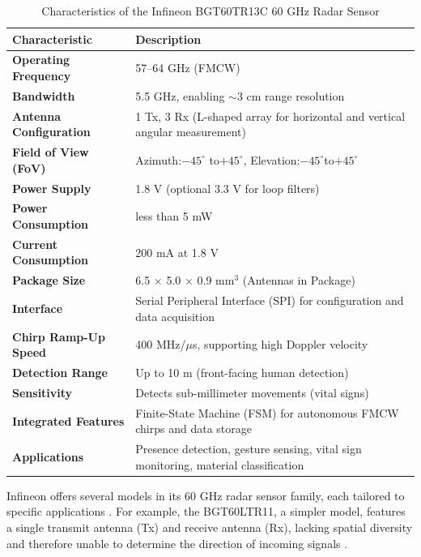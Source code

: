 \begin{table}[h]
\centering
\caption{Characteristics of the Infineon BGT60TR13C 60 GHz Radar Sensor}
\label{tab:bgt60tr13c_specs}
\begin{tabular}{p{4.5cm} p{8cm}}
\toprule
\textbf{Characteristic} & \textbf{Description} \\
\midrule
\textbf{Operating Frequency} & 57--64 GHz (FMCW) \\
\textbf{Bandwidth} & 5.5 GHz, enabling $\sim$3 cm range resolution \\
\textbf{Antenna Configuration} & 1 Tx, 3 Rx (L-shaped array for horizontal and vertical angular measurement) \\
\textbf{Field of View (FoV)} & Azimuth:$-45^\circ$ to$+45^\circ$, Elevation:$-45^\circ$to$+45^\circ$ \\
\textbf{Power Supply} & 1.8 V (optional 3.3 V for loop filters) \\
\textbf{Power Consumption} & less than 5 mW \\
\textbf{Current Consumption} & 200 mA at 1.8 V  \\
\textbf{Package Size} & 6.5 $\times$ 5.0 $\times$ 0.9 mm$^3$ (Antennas in Package) \\
\textbf{Interface} & Serial Peripheral Interface (SPI) for configuration and data acquisition  \\
\textbf{Chirp Ramp-Up Speed} & 400 MHz/$\mu$s, supporting high Doppler velocity  \\
\textbf{Detection Range} & Up to 10 m (front-facing human detection) \\
\textbf{Sensitivity} & Detects sub-millimeter movements (vital signs) \\
\textbf{Integrated Features} & Finite-State Machine (FSM) for autonomous FMCW chirps and data storage \\
\textbf{Applications} & Presence detection, gesture sensing, vital sign monitoring, material classification\\
\bottomrule
\end{tabular}
\end{table}



Infineon offers several models in its 60 GHz radar sensor family, each tailored to specific applications \citep{Infineon2022BGT60TR13C}. For example, the BGT60LTR11, a simpler model, features a single transmit antenna (Tx) and receive antenna (Rx), lacking spatial diversity and therefore unable to determine the direction of incoming signals \citep{Infineon2021BGT60LTR11}. 

